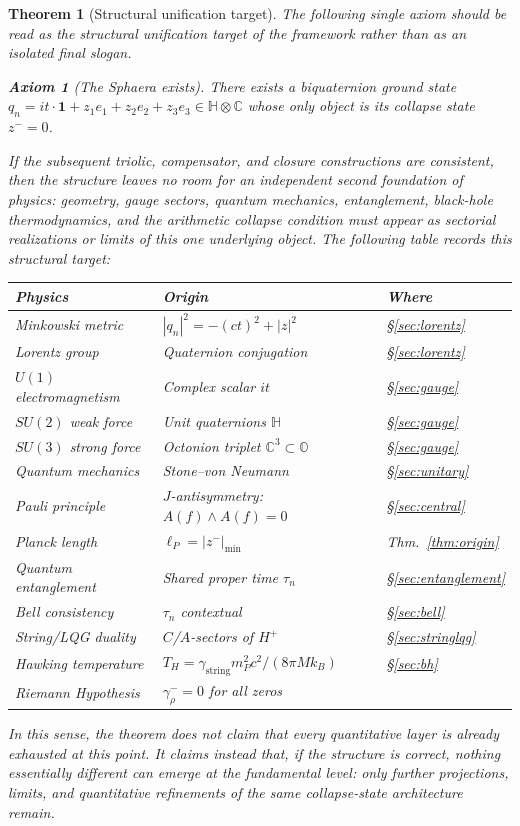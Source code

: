 \documentclass[12pt,a4paper]{article}
\newtheorem{theorem}{Theorem}[section]
\newtheorem{axiom}{Axiom}
\newcommand{\gstring}{\gamma_{\mathrm{string}}}
\newcommand{\lP}{\ell_P}
\newcommand{\zminus}{z^-}
\newcommand{\HH}{\mathbb{H}}
\newcommand{\OO}{\mathbb{O}}
\newcommand{\Hplus}{H^+}
\begin{document}
\begin{theorem}[Structural unification target]\label{thm:toe}
The following single axiom should be read as the structural unification
 target of the framework rather than as an isolated final slogan.
\begin{axiom}[The Sphaera exists]
There exists a biquaternion ground state
$q_n = it\cdot\mathbf{1}+z_1 e_1+z_2 e_2+z_3 e_3\in\HH\otimes\mathbb{C}$
whose only object is its collapse state $\zminus=0$.
\end{axiom}
If the subsequent triolic, compensator, and closure constructions are
consistent, then the structure leaves no room for an independent second
foundation of physics: geometry, gauge sectors, quantum mechanics,
entanglement, black-hole thermodynamics, and the arithmetic collapse
condition must appear as sectorial realizations or limits of this one
underlying object. The following table records this structural target:
\begin{center}
\renewcommand{\arraystretch}{1.2}
\begin{tabular}{lll}
\toprule
Physics & Origin & Where\\
\midrule
Minkowski metric & $|q_n|^2=-(ct)^2+|z|^2$ & \S\ref{sec:lorentz}\\
Lorentz group & Quaternion conjugation & \S\ref{sec:lorentz}\\
$U(1)$ electromagnetism & Complex scalar $it$ & \S\ref{sec:gauge}\\
$SU(2)$ weak force & Unit quaternions $\HH$ & \S\ref{sec:gauge}\\
$SU(3)$ strong force & Octonion triplet $\mathbb{C}^3\subset\OO$ & \S\ref{sec:gauge}\\
Quantum mechanics & Stone--von Neumann & \S\ref{sec:unitary}\\
Pauli principle & $J$-antisymmetry: $A(f)\wedge A(f)=0$ & \S\ref{sec:central}\\
Planck length & $\lP=|\zminus|_{\min}$ & Thm.~\ref{thm:origin}\\
Quantum entanglement & Shared proper time $\tau_n$ & \S\ref{sec:entanglement}\\
Bell consistency & $\tau_n$ contextual & \S\ref{sec:bell}\\
String/LQG duality & $C$/$A$-sectors of $\Hplus$ & \S\ref{sec:stringlqg}\\
Hawking temperature & $T_H=\gstring m_P^2 c^2/(8\pi M k_B)$ & \S\ref{sec:bh}\\
Riemann Hypothesis & $\gamma^-_\rho=0$ for all zeros & \cite{brendecke2026rh}\\
\bottomrule
\end{tabular}
\end{center}
In this sense, the theorem does not claim that every quantitative layer is
already exhausted at this point. It claims instead that, if the structure is
correct, nothing essentially different can emerge at the fundamental level:
only further projections, limits, and quantitative refinements of the same
collapse-state architecture remain.
\end{theorem}
\end{document}
